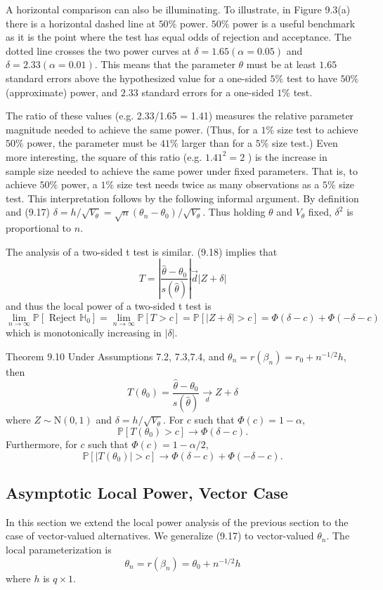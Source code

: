\documentclass[10pt]{article}
\begin{document}
A horizontal comparison can also be illuminating. To illustrate, in Figure 9.3(a) there is a horizontal dashed line at $50 \%$ power. $50 \%$ power is a useful benchmark as it is the point where the test has equal odds of rejection and acceptance. The dotted line crosses the two power curves at $\delta=1.65(\alpha=0.05)$ and $\delta=2.33(\alpha=0.01)$. This means that the parameter $\theta$ must be at least $1.65$ standard errors above the hypothesized value for a one-sided $5 \%$ test to have $50 \%$ (approximate) power, and $2.33$ standard errors for a one-sided $1 \%$ test.

The ratio of these values (e.g. 2.33/1.65 = 1.41) measures the relative parameter magnitude needed to achieve the same power. (Thus, for a $1 \%$ size test to achieve $50 \%$ power, the parameter must be $41 \%$ larger than for a $5 \%$ size test.) Even more interesting, the square of this ratio (e.g. $1.41^{2}=2$ ) is the increase in sample size needed to achieve the same power under fixed parameters. That is, to achieve $50 \%$ power, a $1 \%$ size test needs twice as many observations as a $5 \%$ size test. This interpretation follows by the following informal argument. By definition and (9.17) $\delta=h / \sqrt{V_{\theta}}=\sqrt{n}\left(\theta_{n}-\theta_{0}\right) / \sqrt{V_{\theta}}$. Thus holding $\theta$ and $V_{\theta}$ fixed, $\delta^{2}$ is proportional to $n$.

The analysis of a two-sided t test is similar. (9.18) implies that
$$
T=\left|\frac{\widehat{\theta}-\theta_{0}}{s(\widehat{\theta})}\right| \vec{d}|Z+\delta|
$$
and thus the local power of a two-sided t test is
$$
\lim _{n \rightarrow \infty} \mathbb{P}\left[\text { Reject } \mathbb{H}_{0}\right]=\lim _{n \rightarrow \infty} \mathbb{P}[T>c]=\mathbb{P}[|Z+\delta|>c]=\Phi(\delta-c)+\Phi(-\delta-c)
$$
which is monotonically increasing in $|\delta|$.

Theorem 9.10 Under Assumptions 7.2, 7.3,7.4, and $\theta_{n}=r\left(\beta_{n}\right)=r_{0}+n^{-1 / 2} h$, then
$$
T\left(\theta_{0}\right)=\frac{\widehat{\theta}-\theta_{0}}{s(\widehat{\theta})} \underset{d}{\longrightarrow} Z+\delta
$$
where $Z \sim \mathrm{N}(0,1)$ and $\delta=h / \sqrt{V_{\theta}}$. For $c$ such that $\Phi(c)=1-\alpha$,
$$
\mathbb{P}\left[T\left(\theta_{0}\right)>c\right] \longrightarrow \Phi(\delta-c) .
$$
Furthermore, for $c$ such that $\Phi(c)=1-\alpha / 2$,
$$
\mathbb{P}\left[\left|T\left(\theta_{0}\right)\right|>c\right] \longrightarrow \Phi(\delta-c)+\Phi(-\delta-c) .
$$

\subsection{Asymptotic Local Power, Vector Case}
In this section we extend the local power analysis of the previous section to the case of vector-valued alternatives. We generalize (9.17) to vector-valued $\theta_{n}$. The local parameterization is
$$
\theta_{n}=r\left(\beta_{n}\right)=\theta_{0}+n^{-1 / 2} h
$$
where $h$ is $q \times 1$.
\end{document}

